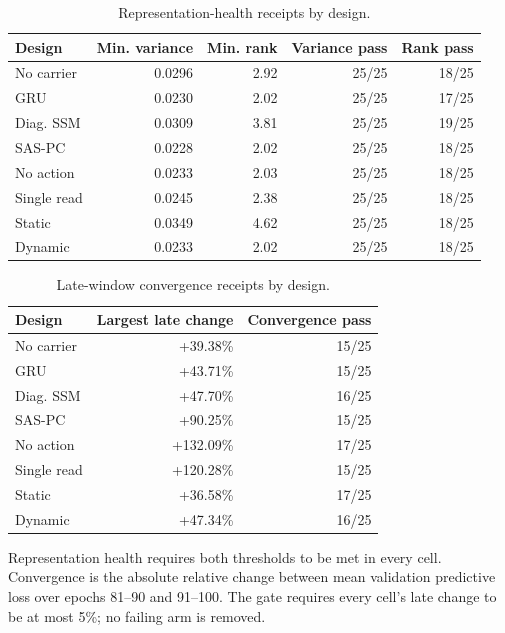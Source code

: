 \begin{table}[H]
\centering
\caption{Representation-health receipts by design.}
\label{tbl:representation-by-design}
\small
\begin{tabular}{@{}lrrrr@{}}
\toprule
\textcolor{NVIDIADark}{\textbf{Design}} & \textcolor{NVIDIADark}{\textbf{Min. variance}} & \textcolor{NVIDIADark}{\textbf{Min. rank}} & \textcolor{NVIDIADark}{\textbf{Variance pass}} & \textcolor{NVIDIADark}{\textbf{Rank pass}} \\
\midrule
No carrier & 0.0296 & 2.92 & 25/25 & 18/25 \\
GRU & 0.0230 & 2.02 & 25/25 & 17/25 \\
Diag. SSM & 0.0309 & 3.81 & 25/25 & 19/25 \\
SAS-PC & 0.0228 & 2.02 & 25/25 & 18/25 \\
No action & 0.0233 & 2.03 & 25/25 & 18/25 \\
Single read & 0.0245 & 2.38 & 25/25 & 18/25 \\
Static & 0.0349 & 4.62 & 25/25 & 18/25 \\
Dynamic & 0.0233 & 2.02 & 25/25 & 18/25 \\
\bottomrule
\end{tabular}
\end{table}

\begin{table}[H]
\centering
\caption{Late-window convergence receipts by design.}
\label{tbl:convergence-by-design}
\small
\begin{tabular}{@{}lrr@{}}
\toprule
\textcolor{NVIDIADark}{\textbf{Design}} & \textcolor{NVIDIADark}{\textbf{Largest late change}} & \textcolor{NVIDIADark}{\textbf{Convergence pass}} \\
\midrule
No carrier & +39.38\% & 15/25 \\
GRU & +43.71\% & 15/25 \\
Diag. SSM & +47.70\% & 16/25 \\
SAS-PC & +90.25\% & 15/25 \\
No action & +132.09\% & 17/25 \\
Single read & +120.28\% & 15/25 \\
Static & +36.58\% & 17/25 \\
Dynamic & +47.34\% & 16/25 \\
\bottomrule
\end{tabular}
\end{table}

Representation health requires both thresholds to be met in every cell.
Convergence is the absolute relative change between mean validation
predictive loss over epochs 81--90 and 91--100. The gate requires every
cell's late change to be at most 5\%; no failing arm is removed.

